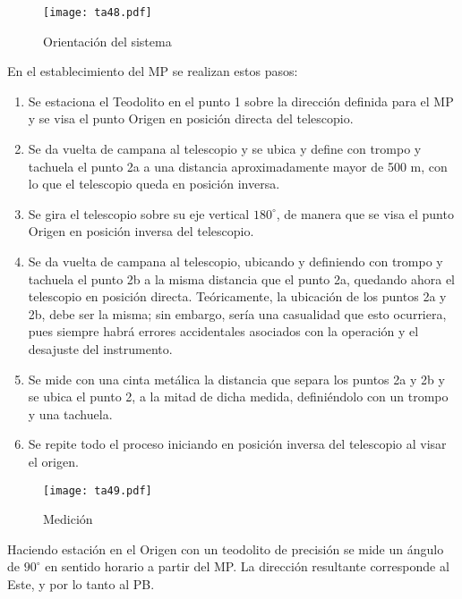 \begin{figure}[h!]
\centering
  \texttt{[image: ta48.pdf]}
  \caption{Orientación del sistema}
  \label{ta48}
\end{figure}

En el establecimiento del MP se realizan estos pasos:
\begin{enumerate}
    \item Se estaciona el Teodolito en el punto 1 sobre la dirección definida para el MP y se visa el punto Origen en posición directa del telescopio.
    \item Se da vuelta de campana al telescopio y se ubica y define con trompo y tachuela el punto 2a a una distancia aproximadamente mayor de 500 m, con lo que el telescopio queda en posición inversa.
    \item Se gira el telescopio sobre su eje vertical $180^{\circ}$, de manera que se visa el punto Origen en posición inversa del telescopio.
    \item Se da vuelta de campana al telescopio, ubicando y definiendo con trompo y tachuela el punto 2b a la misma distancia que el punto 2a, quedando ahora el telescopio en posición directa. Teóricamente, la ubicación de los puntos 2a y 2b, debe ser la misma; sin embargo, sería una casualidad que esto ocurriera, pues siempre habrá errores accidentales asociados con la operación y el desajuste del instrumento.
    \item Se mide con una cinta metálica la distancia que separa los puntos 2a y 2b y se ubica el punto 2, a la mitad de dicha medida, definiéndolo con un trompo y una tachuela.
    \item Se repite todo el proceso iniciando en posición inversa del telescopio al visar el origen.
\end{enumerate}
\begin{figure}[h!]
\centering
  \texttt{[image: ta49.pdf]}
  \caption{Medición}
  \label{ta49}
\end{figure}


Haciendo estación en el Origen con un teodolito de precisión se mide un ángulo de $90^{\circ}$ en sentido horario a partir del MP. La dirección resultante corresponde al Este, y por lo tanto al PB.

